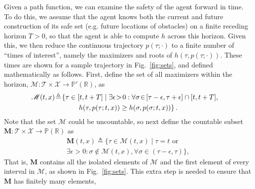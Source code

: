 \documentclass[10pt,conference]{ieeeconf}
\renewcommand{\(}{\left(}
\renewcommand{\)}{\right)}
\renewcommand{\[}{\left[}
\renewcommand{\]}{\right]}
\newcommand{\reals}{\mathbb{R}}
\begin{document}
Given a path function, we can examine the safety of the agent forward in time. To do this, we assume {that} the agent {knows both the current and future construction of its safe set}
(e.g. future locations of obstacles) { on a finite receding horizon $T > 0$}, so that {the agent} is able to compute $h$ {across this horizon}. 
%
{Given this, we then reduce the continuous trajectory $p(\tau;\cdot)$ to a finite number of ``times of interest'', namely the maximizers and roots of $h(\tau, p(\tau; \cdot))$. These times are shown for a sample trajectory in Fig.~\ref{fig:sets}, and defined mathematically as follows. First,} define the set of all maximizers within the horizon, ${\mathscr{M}}:\mathcal{T}\times\mathcal{X}\rightarrow \mathbb{P}'(\reals)$, as
\begin{multline}
    \hspace{-10pt} {\mathscr{M}}(t,x) \hspace{-1.5pt}\triangleq\hspace{-1.5pt} \{ \tau \in [t, t+T] \mid \exists \epsilon \hspace{-1.5pt}>\hspace{-1.5pt} 0 : \forall \sigma \hspace{-1.5pt}\in\hspace{-1.5pt} [\tau-\epsilon,\tau+\epsilon] \cap [t, t+T], \\ h(\tau, p(\tau; t,x)) \geq h(\sigma, p(\sigma; t,x)) \} \,. \label{eq:def_M}
\end{multline}
{Note that the set $\mathscr{M}$ could be uncountable, so next define the countable subset} $\boldsymbol{M}:\mathcal{T}\times\mathcal{X}\rightarrow\mathbb{P}(\reals)$ as
\begin{multline}
    \boldsymbol{M}(t,x) \triangleq \{ \tau \in {\mathscr{M}}(t,x) \mid \tau = t \textrm{ or } \\ \exists \epsilon > 0 : \sigma \notin {\mathscr{M}}(t,x), \forall \sigma \in (\tau - \epsilon, \tau) \}, \label{eq:def_Mstar}
\end{multline}
That is, $\boldsymbol{M}$ contains all the isolated elements of ${\mathscr{M}}$ and the first element of every interval in ${\mathscr{M}}${, as shown in Fig.~\ref{fig:sets}}. This extra step is needed to ensure that $\boldsymbol{M}$ has finitely many elements, %
\end{document}
